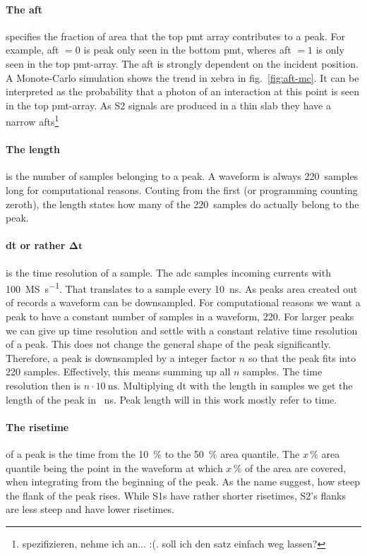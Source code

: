 \paragraph{The \gls{aft}} specifies the fraction of area that the top \gls{pmt} array contributes to a peak.
For example, \gls{aft} $ = 0 $ is peak only seen in the bottom \gls{pmt}, wheres \gls{aft} $ = 1 $ is only seen in the top \gls{pmt}-array.
The \gls{aft} is strongly dependent on the incident position.
A Monote-Carlo simulation shows the trend in \gls{xebra} in fig.~\ref{fig:aft-mc}. %
It can be interpreted as the probability that a photon of an interaction at this point is seen in the top \gls{pmt}-array.
As S2 signals are produced in a thin slab they have a narrow \gls{aft}s\footnote{spezifizieren, nehme ich an... :(. soll ich den satz einfach weg lassen?}

\paragraph{The length} is the number of samples belonging to a peak.
A waveform is always \SI{220}{samples} long for computational reasons.
Couting from the first (or programming counting zeroth), the length states how many of the \SI{220}{samples} do actually belong to the peak.

\paragraph{dt or rather $ \mathbf{\Delta t}$} is the time resolution of a sample.
The \gls{adc} samples incoming currents with \SI{100}{\mega S\per\second}.
That translates to a sample every \SI{10}{\nano\second}.
As peaks area created out of records a waveform can be downsampled.
For computational reasons we want a peak to have a constant number of samples in a waveform, 220.
For larger peaks we can give up time resolution and settle with a constant relative time resolution of a peak.
This does not change the general shape of the peak significantly.
Therefore, a peak is downsampled by a integer factor $ n $ so that the peak fits into 220 samples.
Effectively, this means summing up all $ n $ samples.
The time resolution then is $ n \cdot \SI{10}{\nano\second} $.
Multiplying dt with the length in samples we get the length of the peak in \SI{}{\nano\second}.
Peak length will in this work mostly refer to time.

\paragraph{The risetime} of a peak is the time from the \SI{10}{\%} to the \SI{50}{\%} area quantile.
The $ x\,\% $ area quantile being the point in the waveform at which $ x\,\% $ of the area are covered, when integrating from the beginning of the peak.
As the name suggest, how steep the flank of the peak rises.
While S1s have rather shorter risetimes, S2's flanks are less steep and have lower risetimes.

